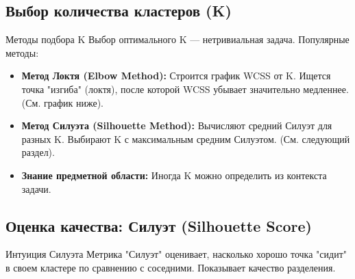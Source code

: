 \subsection{Выбор количества кластеров (K)}
\begin{myexampleblock}{Методы подбора K}
    Выбор оптимального K — нетривиальная задача. Популярные методы:
    \begin{itemize}[nosep, leftmargin=*]
        \item \textbf{Метод Локтя (Elbow Method):} Строится график WCSS от K. Ищется точка "изгиба" (локтя), после которой WCSS убывает значительно медленнее. (См. график ниже).
        \item \textbf{Метод Силуэта (Silhouette Method):} Вычисляют средний Силуэт для разных K. Выбирают K с максимальным средним Силуэтом. (См. следующий раздел).
        \item \textbf{Знание предметной области:} Иногда K можно определить из контекста задачи.
    \end{itemize}
    \begin{center}
    \end{center}
\end{myexampleblock}

\subsection{Оценка качества: Силуэт (Silhouette Score)}
\begin{textbox}{Интуиция Силуэта}
    Метрика "Силуэт" оценивает, насколько хорошо точка "сидит" в своем кластере по сравнению с соседними. Показывает качество разделения.
\end{textbox}

